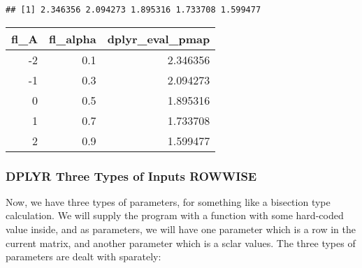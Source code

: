 \documentclass[
]{book}
\newenvironment{Shaded}{\begin{snugshade}}{\end{snugshade}}
\newcommand{\CommentTok}[1]{\textcolor[rgb]{0.56,0.35,0.01}{\textit{#1}}}
\newcommand{\DataTypeTok}[1]{\textcolor[rgb]{0.13,0.29,0.53}{#1}}
\newcommand{\KeywordTok}[1]{\textcolor[rgb]{0.13,0.29,0.53}{\textbf{#1}}}
\newcommand{\NormalTok}[1]{#1}
\newcommand{\OperatorTok}[1]{\textcolor[rgb]{0.81,0.36,0.00}{\textbf{#1}}}
\newcommand{\StringTok}[1]{\textcolor[rgb]{0.31,0.60,0.02}{#1}}
\begin{document}
\begin{verbatim}
## [1] 2.346356 2.094273 1.895316 1.733708 1.599477
\end{verbatim}

\begin{Shaded}
\end{Shaded}

\begin{table}[!h]
\centering
\begin{tabular}{r|r|r}
\hline
fl\_A & fl\_alpha & dplyr\_eval\_pmap\\
\hline
\rowcolor{gray!6}  -2 & 0.1 & 2.346356\\
\hline
-1 & 0.3 & 2.094273\\
\hline
\rowcolor{gray!6}  0 & 0.5 & 1.895316\\
\hline
1 & 0.7 & 1.733708\\
\hline
\rowcolor{gray!6}  2 & 0.9 & 1.599477\\
\hline
\end{tabular}
\end{table}

\hypertarget{dplyr-three-types-of-inputs-rowwise}{%
\subsubsection{DPLYR Three Types of Inputs ROWWISE}\label{dplyr-three-types-of-inputs-rowwise}}

Now, we have three types of parameters, for something like a bisection type calculation. We will supply the program with a function with some hard-coded value inside, and as parameters, we will have one parameter which is a row in the current matrix, and another parameter which is a sclar values. The three types of parameters are dealt with sparately:
\end{document}
